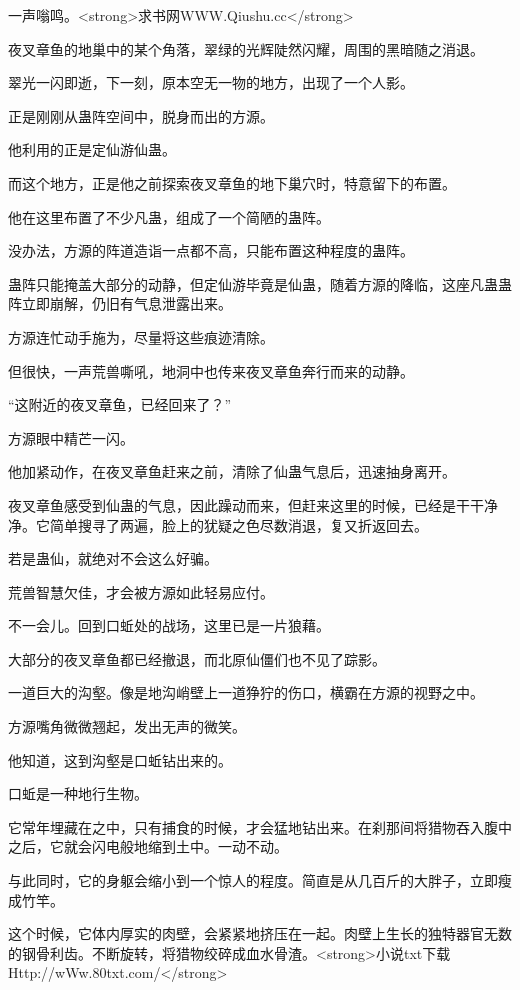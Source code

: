 
\begin{this_body}

一声嗡鸣。<strong>求书网WWW.Qiushu.cc</strong>

夜叉章鱼的地巢中的某个角落，翠绿的光辉陡然闪耀，周围的黑暗随之消退。

翠光一闪即逝，下一刻，原本空无一物的地方，出现了一个人影。

正是刚刚从蛊阵空间中，脱身而出的方源。

他利用的正是定仙游仙蛊。

而这个地方，正是他之前探索夜叉章鱼的地下巢穴时，特意留下的布置。

他在这里布置了不少凡蛊，组成了一个简陋的蛊阵。

没办法，方源的阵道造诣一点都不高，只能布置这种程度的蛊阵。

蛊阵只能掩盖大部分的动静，但定仙游毕竟是仙蛊，随着方源的降临，这座凡蛊蛊阵立即崩解，仍旧有气息泄露出来。

方源连忙动手施为，尽量将这些痕迹清除。

但很快，一声荒兽嘶吼，地洞中也传来夜叉章鱼奔行而来的动静。

“这附近的夜叉章鱼，已经回来了？”

方源眼中精芒一闪。

他加紧动作，在夜叉章鱼赶来之前，清除了仙蛊气息后，迅速抽身离开。

夜叉章鱼感受到仙蛊的气息，因此躁动而来，但赶来这里的时候，已经是干干净净。它简单搜寻了两遍，脸上的犹疑之色尽数消退，复又折返回去。

若是蛊仙，就绝对不会这么好骗。

荒兽智慧欠佳，才会被方源如此轻易应付。

不一会儿。回到口蚯处的战场，这里已是一片狼藉。

大部分的夜叉章鱼都已经撤退，而北原仙僵们也不见了踪影。

一道巨大的沟壑。像是地沟峭壁上一道狰狞的伤口，横霸在方源的视野之中。

方源嘴角微微翘起，发出无声的微笑。

他知道，这到沟壑是口蚯钻出来的。

口蚯是一种地行生物。

它常年埋藏在之中，只有捕食的时候，才会猛地钻出来。在刹那间将猎物吞入腹中之后，它就会闪电般地缩到土中。一动不动。

与此同时，它的身躯会缩小到一个惊人的程度。简直是从几百斤的大胖子，立即瘦成竹竿。

这个时候，它体内厚实的肉壁，会紧紧地挤压在一起。肉壁上生长的独特器官无数的钢骨利齿。不断旋转，将猎物绞碎成血水骨渣。<strong>小说txt下载Http://wWw.80txt.com/</strong>


\end{this_body}
